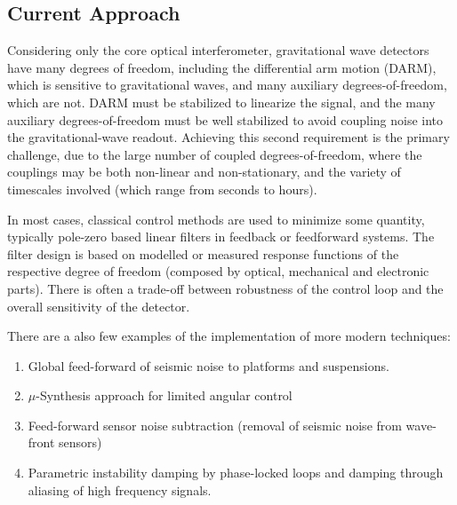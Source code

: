 \subsection{Current Approach}
Considering only the core optical interferometer, gravitational wave detectors have many degrees of freedom,  including the differential arm motion (DARM), which is sensitive to gravitational waves, and many auxiliary degrees-of-freedom, which are not. DARM must be stabilized to linearize the signal, and the many auxiliary degrees-of-freedom must be well stabilized to avoid coupling noise into the gravitational-wave readout. Achieving this second requirement is the primary challenge, due to the large number of coupled degrees-of-freedom, where the couplings may be both non-linear and non-stationary, and the variety of timescales involved (which range from seconds to hours).

In most cases, classical control methods are used to minimize some quantity, typically pole-zero based linear filters in feedback or feedforward systems.
The filter design is based on modelled or measured response functions of the respective degree of freedom (composed by optical, mechanical and electronic parts). There is often a trade-off between robustness of the control loop and the overall sensitivity of the detector.

There are a also few examples of the implementation of more modern techniques:
\begin{enumerate}
\item  Global feed-forward of seismic noise to platforms and suspensions.
\item  $\mu$-Synthesis approach for limited angular control
\item  Feed-forward sensor noise subtraction (removal of seismic noise from wave-front sensors)
\item  Parametric instability damping by phase-locked loops and damping through aliasing of high frequency signals.
\end{enumerate}

